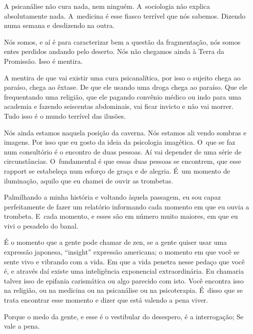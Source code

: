  

A psicanálise não cura nada, nem ninguém. A~sociologia não explica
absolutamente nada. A~medicina é esse fiasco terrível que nós sabemos.
Dizendo numa semana e desdizendo na outra.

 

Nós somos, e aí é para caracterizar bem a questão da fragmentação, nós
somos entes perdidos andando pelo deserto. Nós não chegamos ainda à
Terra da Promissão. Isso é mentira.

 

A mentira de que vai existir uma cura psicanalítica, por isso o
sujeito chega ao paraíso, chega ao êxtase. De que ele usando uma droga
chega ao paraíso. Que ele frequentando uma religião, que ele pagando
convênio médico ou indo para uma academia e fazendo seiscentas
abdominais, vai ficar invicto e não vai morrer. Tudo isso é o mundo
terrível das ilusões.

 

Nós ainda estamos naquela posição da caverna. Nós estamos ali vendo
sombras e imagens. Por isso que eu gosto da ideia da psicologia
imagética. O~que se faz num consultório é o encontro de duas pessoas. Aí
vai depender de uma série de circunstâncias. O~fundamental é que essas
duas pessoas se encontrem, que esse rapport se estabeleça num esforço de
graça e de alegria. É~um momento de iluminação, aquilo que eu chamei de
ouvir as trombetas.

 

Palmilhando a minha história e voltando àquela passagem, eu sou capaz
perfeitamente de fazer um relatório informando cada momento em que eu
ouvia a trombeta. E~cada momento, e esses são em número muito maiores,
em que eu vivi o pesadelo do banal.

 

É o momento que a gente pode chamar de zen, se a gente quiser usar uma
expressão japonesa, ``insight'' expressão americana; o momento em que
você se sente vivo e vibrando com a vida. Em que a vida penetra nesse
pedaço que você é, e através daí existe uma inteligência exponencial
extraordinária. Eu chamaria talvez isso de epifania carismática ou algo
parecido com isto. Você encontra isso na religião, ou na medicina ou na
psicanálise ou na psicoterapia. É~disso que se trata encontrar esse
momento e dizer que está valendo a pena viver.

 

Porque o medo da gente, e esse é o vestibular do desespero, é a
interrogação; Se vale a pena.

